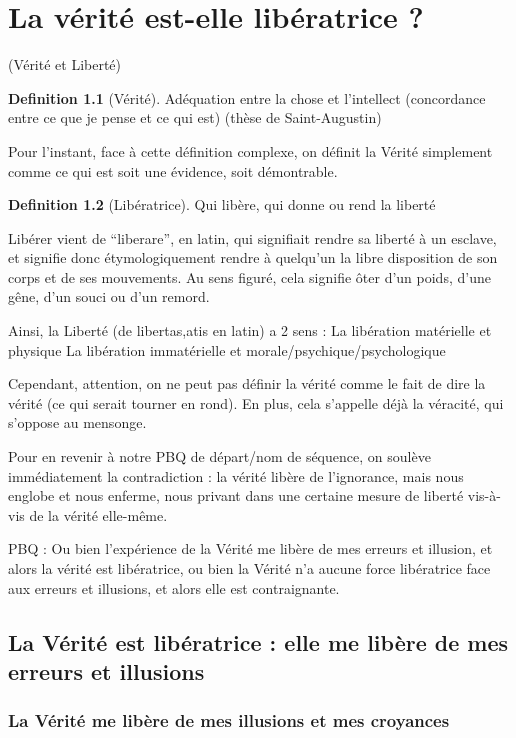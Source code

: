 \documentclass[french]{book}
\theoremstyle{definition}
\newtheorem*{dfn}{Definition}
\begin{document}
\chapter{La vérité est-elle libératrice ?}
(Vérité et Liberté)

\begin{dfn}[Vérité]
	Adéquation entre la chose et l'intellect (concordance entre ce que je pense et ce qui est) (thèse de Saint-Augustin)
\end{dfn}


Pour l'instant, face à cette définition complexe, on définit la Vérité simplement comme ce qui est soit une évidence, soit démontrable.


\begin{dfn}[Libératrice]
	Qui libère, qui donne ou rend la liberté
\end{dfn}


Libérer vient de “liberare”, en latin, qui signifiait rendre sa liberté à un esclave, et signifie donc étymologiquement rendre à quelqu'un la libre disposition de son corps et de ses mouvements. Au sens figuré, cela signifie ôter d'un poids, d'une gêne, d'un souci ou d'un remord.

Ainsi, la Liberté (de libertas,atis en latin) a 2 sens : 
La libération matérielle et physique
La libération immatérielle et morale/psychique/psychologique

Cependant, attention, on ne peut pas définir la vérité comme le fait de dire la vérité (ce qui serait tourner en rond). En plus, cela s'appelle déjà la véracité, qui s'oppose au mensonge.

Pour en revenir à notre PBQ de départ/nom de séquence, on soulève immédiatement la contradiction : la vérité libère de l'ignorance, mais nous englobe et nous enferme, nous privant dans une certaine mesure de liberté vis-à-vis de la vérité elle-même.

PBQ :
Ou bien l'expérience de la Vérité me libère de mes erreurs et illusion, et alors la vérité est libératrice, ou bien la Vérité n'a aucune force libératrice face aux erreurs et illusions, et alors elle est contraignante.

\section{La Vérité est libératrice : elle me libère de mes erreurs et illusions}

\subsection{La Vérité me libère de mes illusions et mes croyances}
\end{document}
